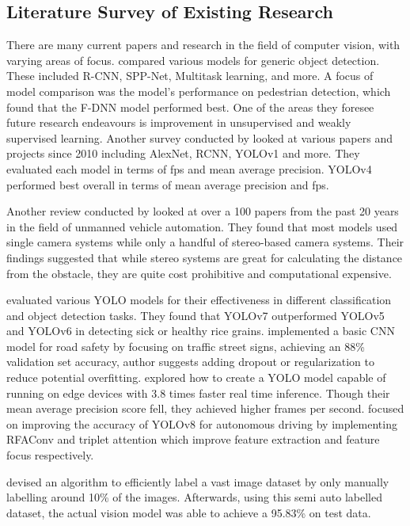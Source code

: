\documentclass[stu,12pt,floatsintext]{apa7}
\begin{document}
\subsection{Literature Survey of Existing Research}
There are many current papers and research in the field of computer vision, with varying areas of focus. \textcite{zhao_object_2019} compared various models for generic object detection. These included R-CNN, SPP-Net, Multitask learning, and more. A focus of model comparison was the model's performance on pedestrian detection, which found that the F-DNN model \parencite{du_fused_2017} performed best.
One of the areas they foresee future research endeavours is improvement in unsupervised and weakly supervised learning. Another survey conducted by \textcite{turay_toward_2022} looked at various papers and projects since 2010 including AlexNet, RCNN, YOLOv1 and more. They evaluated each model in terms of fps and mean average precision. YOLOv4 performed best overall in terms of mean average precision and fps.

Another review conducted by \textcite{badrloo_image-based_2022} looked at over a 100 papers from the past 20 years in the field of unmanned vehicle automation. They found that most models used single camera systems while only a handful of stereo-based camera systems. Their findings suggested that while stereo systems are great for calculating the distance from the obstacle, they are quite cost prohibitive and computational expensive.

\textcite{quach_evaluating_2023} evaluated various YOLO models for their effectiveness in different classification and object detection tasks. They found that YOLOv7 outperformed YOLOv5 and YOLOv6 in detecting sick or healthy rice grains. \textcite{hindarto_enhancing_2023} implemented a basic CNN model for road safety by focusing on traffic street signs, achieving an 88\% validation set accuracy, author suggests adding dropout or regularization to reduce potential overfitting. \textcite{pedoeem_yolo-lite_2018} explored how to create a YOLO model capable of running on edge devices with 3.8 times faster real time inference. Though their mean average precision score fell, they achieved higher frames per second. \textcite{ling_optimization_2024} focused on improving the accuracy of YOLOv8 for autonomous driving by implementing RFAConv and triplet attention which improve feature extraction and feature focus respectively.

\textcite{hu_novel_2019} devised an algorithm to efficiently label a vast image dataset by only manually labelling around 10\% of the images. Afterwards, using this semi auto labelled dataset, the actual vision model was able to achieve a 95.83\% on test data.
\end{document}
